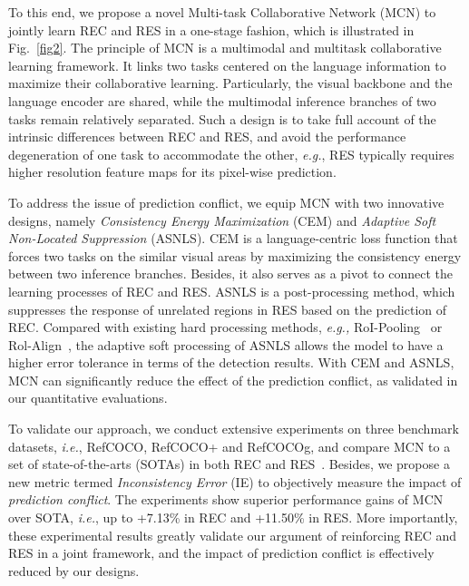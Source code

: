 \documentclass[10pt,twocolumn,letterpaper]{article}
\begin{document}
To this end, we propose a novel Multi-task Collaborative Network (MCN) to jointly learn REC and RES in a one-stage fashion,  which is illustrated  in Fig.~\ref{fig2}. 
The principle of  MCN is a multimodal and multitask collaborative learning framework.  It   links  two tasks centered on the language information  to maximize their collaborative learning. 
Particularly, the visual backbone and the language encoder are shared, while the multimodal inference branches of two tasks  remain relatively separated.
Such a design is to take full account of the intrinsic differences between REC and RES,  and avoid  the performance  degeneration of one task   to accommodate the other, \emph{e.g.},  RES typically requires higher resolution feature maps for its pixel-wise prediction.  


To address the issue  of prediction conflict, we equip MCN with two innovative designs, namely \emph{Consistency Energy Maximization} (CEM) and \emph{Adaptive Soft Non-Located Suppression} (ASNLS).  
CEM is a language-centric loss function that  forces two tasks on  the similar visual areas by maximizing the consistency energy between two inference branches. Besides, it also serves as a pivot to connect the learning processes of REC and RES.  ASNLS is a  post-processing method, which  suppresses the response of unrelated regions in RES based on the prediction of REC. Compared with existing hard processing methods, \emph{e.g.,} RoI-Pooling~\cite{ren2017faster} or Rol-Align~\cite{he2017mask}, the adaptive  soft processing of ASNLS  allows the model to have a higher error tolerance in terms of the detection results. 
With CEM and ASNLS, MCN can significantly reduce the effect of the prediction conflict, as validated in our quantitative evaluations.


To validate our approach, we conduct extensive experiments on three benchmark datasets, \emph{i.e.}, RefCOCO, RefCOCO+ and RefCOCOg, and compare MCN to a set of state-of-the-arts (SOTAs) in both REC and RES~\cite{yu2018mattnet:,yang2019fast,CMSA,RRN,liu2019learning,wang2019neighbourhood}.
Besides, we propose a new metric termed  \emph{Inconsistency Error} (IE) to objectively measure the impact of \emph{prediction conflict}. 
The experiments show  superior performance gains of MCN over  SOTA, \emph{i.e.},  up to +7.13\%  in REC and +11.50\%  in RES. 
More importantly, these experimental results greatly validate  our argument of reinforcing REC and RES in a joint framework, and the impact of prediction conflict is  effectively reduced by our   designs. 
\end{document}
